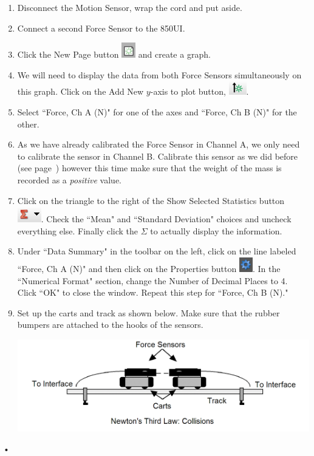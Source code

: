 \documentclass[main.tex]{subfiles}
\begin{document}
\begin{enumerate}
\item
Disconnect the Motion Sensor, wrap the cord and put aside.
\item
Connect a second Force Sensor to the 850UI.
\item
Click the New Page button \includegraphics{Add_Page} and create a graph.
\item
We will need to display the data from both Force Sensors simultaneously on this graph. Click on the Add New $y$-axis to plot button, \includegraphics{Add_New_Y-Axis}.
\item
Select ``Force, Ch A (N)" for one of the axes and ``Force, Ch B (N)" for the other.
\item
As we have already calibrated the Force Sensor in Channel A, we only need to calibrate the sensor in Channel B. Calibrate this sensor as we did before (see page~\pageref{page:Calibration}) however this time make sure that the weight of the mass is recorded as a \emph{positive} value.
\item
Click on the triangle to the right of the Show Selected Statistics button \includegraphics{Statistics}. Check the ``Mean" and ``Standard Deviation" choices and uncheck everything else. Finally click the $\Sigma$ to actually display the information. 
\item
Under ``Data Summary" in the toolbar on the left, click on the line labeled ``Force, Ch A (N)" and then click on the Properties button \includegraphics{Properties}. In the ``Numerical Format" section, change the Number of Decimal Places to 4. Click ``OK" to close the window. Repeat this step for ``Force, Ch B (N)."
\item
Set up the carts and track as shown below. Make sure that the rubber bumpers are attached to the hooks of the sensors.

\includegraphics[width=\textwidth]{Imp-Mom_2_Setup}
\end{enumerate}•
\end{document}
